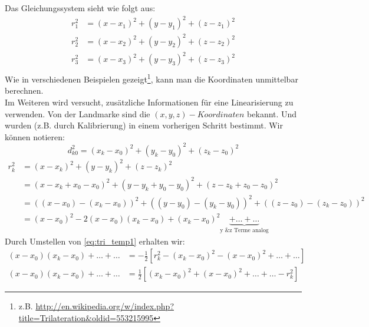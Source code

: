 Das Gleichungssystem sieht wie folgt aus:
\begin{align}
	r_{1}^2 &= (x-x_1)^2+(y-y_1)^2+(z-z_1)^2 \nonumber\\
	r_{2}^2 &= (x-x_2)^2+(y-y_2)^2+(z-z_2)^2 \nonumber\\
	r_{3}^2 &= (x-x_3)^2+(y-y_3)^2+(z-z_3)^2 \nonumber\\
%	
\end{align}
%
Wie in verschiedenen Beispielen gezeigt\footnote{z.B. \url{http://en.wikipedia.org/w/index.php?title=Trilateration&oldid=553215995}}, kann man die Koordinaten unmittelbar berechnen.\\
Im Weiteren wird versucht, zusätzliche Informationen für eine Linearisierung zu verwenden. Von der Landmarke sind die $(x,y,z)-Koordinaten$ bekannt. Und wurden (z.B. durch Kalibrierung) in einem vorherigen Schritt bestimmt.
Wir können notieren:
%
\begin{equation}\label{eq:d_k0}
d_{k0}^2= (x_k-x_0)^2+(y_k-y_0)^2+(z_k-z_0)^2
\end{equation}
%
\begin{align}
	r_{k}^2 &= (x-x_k)^2+(y-y_k)^2+(z-z_k)^2 \nonumber \\
	&=(x-x_k+x_0-x_0)^2+(y-y_k+y_0-y_0)^2+(z-z_k+z_0-z_0)^2 \nonumber \\
	&=((x-x_0)-(x_k-x_0))^2+((y-y_0)-(y_k-y_0))^2+((z-z_0)-(z_k-z_0))^2 \nonumber \\ 
	&=(x-x_0)^2-2(x-x_0)(x_k-x_0)+(x_k-x_0)^2\underbrace{+\dots{}+\dots{}}_\text{y \& z Terme analog}\label{eq:tri_temp1}
%
\end{align}
%
Durch Umstellen von \eqref{eq:tri_temp1} erhalten wir:
\begin{align}
(x-x_0)(x_k-x_0)+\dots{}+\dots{}&= -\frac{1}{2}[r_k^2-(x_k-x_0)^2 -(x-x_0)^2 +\dots{} +\dots{}]\nonumber\\
(x-x_0)(x_k-x_0)+\dots{}+\dots{}&= \frac{1}{2}[(x_k-x_0)^2 +(x-x_0)^2 +\dots{}+\dots{}-r_k^2]\nonumber
%
\end{align}

